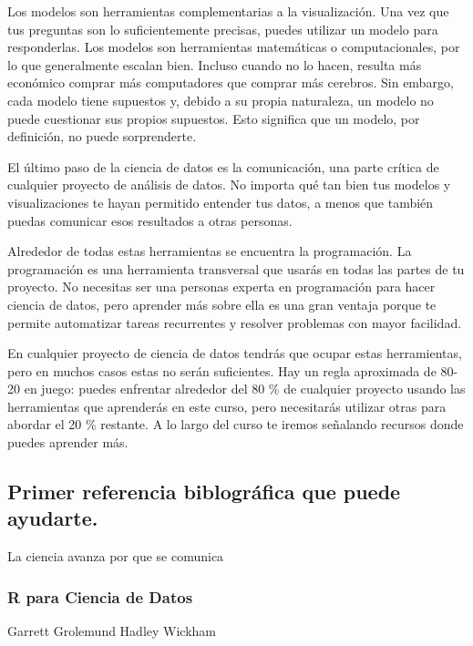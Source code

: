 \documentclass[]{article}
\begin{document}
Los modelos son herramientas complementarias a la visualización. Una vez
que tus preguntas son lo suficientemente precisas, puedes utilizar un
modelo para responderlas. Los modelos son herramientas matemáticas o
computacionales, por lo que generalmente escalan bien. Incluso cuando no
lo hacen, resulta más económico comprar más computadores que comprar más
cerebros. Sin embargo, cada modelo tiene supuestos y, debido a su propia
naturaleza, un modelo no puede cuestionar sus propios supuestos. Esto
significa que un modelo, por definición, no puede sorprenderte.

El último paso de la ciencia de datos es la comunicación, una parte
crítica de cualquier proyecto de análisis de datos. No importa qué tan
bien tus modelos y visualizaciones te hayan permitido entender tus
datos, a menos que también puedas comunicar esos resultados a otras
personas.

Alrededor de todas estas herramientas se encuentra la programación. La
programación es una herramienta transversal que usarás en todas las
partes de tu proyecto. No necesitas ser una personas experta en
programación para hacer ciencia de datos, pero aprender más sobre ella
es una gran ventaja porque te permite automatizar tareas recurrentes y
resolver problemas con mayor facilidad.

En cualquier proyecto de ciencia de datos tendrás que ocupar estas
herramientas, pero en muchos casos estas no serán suficientes. Hay un
regla aproximada de 80-20 en juego: puedes enfrentar alrededor del 80 \%
de cualquier proyecto usando las herramientas que aprenderás en este
curso, pero necesitarás utilizar otras para abordar el 20 \% restante. A
lo largo del curso te iremos señalando recursos donde puedes aprender
más.

\subsection{Primer referencia biblográfica que puede
ayudarte.}\label{primer-referencia-biblogruxe1fica-que-puede-ayudarte.}

La ciencia avanza por que se comunica

\subsubsection{R para Ciencia de Datos}\label{r-para-ciencia-de-datos}

Garrett Grolemund Hadley Wickham
\end{document}
